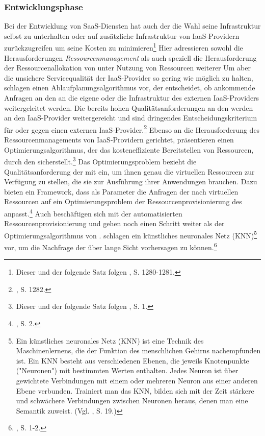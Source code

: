 \subsubsection{Entwicklungsphase}
\label{sec:LoesungEntwicklungsphase}
Bei der Entwicklung von \acs{SaaS}-Diensten hat auch der \CSP die Wahl seine Infrastruktur selbst zu unterhalten oder auf zusätzliche \CC Infrastruktur von \acs{IaaS}-Providern zurückzugreifen um seine Kosten zu minimieren\footnote{Dieser und der folgende Satz folgen \cite{Wu.2012}, S. 1280-1281.}
Hier adressieren \cite{Wu.2012} sowohl die Herausforderungen \emph{Ressourcenmanagement} als auch speziell die Herausforderung der Ressourcenallokation von \CSPn unter Nutzung von Ressourcen weiterer \CSPDot
Um aber die unsichere Servicequalität der \acs{IaaS}-Provider so gering wie möglich zu halten, schlagen \cite{Wu.2012} einen Ablaufplanungsalgorithmus vor, der entscheidet, ob ankommende Anfragen an den \CS an die eigene oder die \CC Infrastruktur des externen \acs{IaaS}-Providers weitergeleitet werden. 
Die bereits hohen Qualitätsanforderungen an den \CSP werden an den \acs{IaaS}-Provider weitergereicht und sind dringendes Entscheidungskriterium für oder gegen einen externen \acs{IaaS}-Provider.\footnote{\cite{Wu.2012}, S. 1282.}
\newline
Ebenso an die Herausforderung des Ressourcenmanagements von \acs{IaaS}-Providern gerichtet, präsentieren \cite{Papagianni.2013} einen Optimierungsalgorithmus, der das kosteneffiziente Bereitstellen von \CC Ressourcen, durch den \CSPComma sicherstellt.\footnote{Dieser und der folgende Satz folgen \cite{Papagianni.2013}, S. 1.} 
Das Optimierungsproblem bezieht die Qualitätsanforderung der \CSU mit ein, um ihnen genau die virtuellen Ressourcen zur Verfügung zu stellen, die sie zur Ausführung ihrer Anwendungen brauchen. Dazu bieten \cite{Papagianni.2013} ein Framework, dass als Parameter die Anfragen der \CSU nach virtuellen Ressourcen auf ein Optimierungsproblem der Ressourcenprovisionierung des \CSP anpasst.\footnote{\cite{Papagianni.2013}, S. 2.}
\newline
Auch \cite{Kousiouris.2012} beschäftigen sich mit der automatisierten Ressourcenprovisionierung und gehen noch einen Schritt weiter als der Optimierungsalgorithmus von \cite{Papagianni.2013}. 
\cite{Kousiouris.2012} schlagen ein künstliches neuronales Netz (\acs{KNN})\footnote{Ein künstliches neuronales Netz (\acs{KNN}) ist eine Technik des Maschinenlernens, die der Funktion des menschlichen Gehirns nachempfunden ist. Ein \acs{KNN} besteht aus verschiedenen Ebenen, die jeweils Knotenpunkte ("Neuronen") mit bestimmten Werten enthalten. Jedes Neuron ist über gewichtete Verbindungen mit einem oder mehreren Neuron aus einer anderen Ebene verbunden. Trainiert man das \acs{KNN}, bilden sich mit der Zeit stärkere und schwächere Verbindungen zwischen Neuronen heraus, denen man eine Semantik zuweist. (Vgl. \cite{Nallur.2012}, S. 19.)} vor, um die Nachfrage der \CSU über lange Sicht vorhersagen zu können.\footnote{\cite{Kousiouris.2012}, S. 1-2.}
